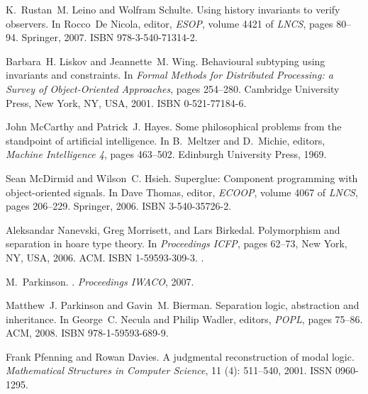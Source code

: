 \documentclass[natbib]{sigplanconf}
\begin{document}
\begin{thebibliography}{26}
K.~Rustan~M. Leino and Wolfram Schulte.
\newblock Using history invariants to verify observers.
\newblock In Rocco~De Nicola, editor, \emph{ESOP}, volume 4421 of \emph{LNCS},
  pages 80--94. Springer, 2007.
\newblock ISBN 978-3-540-71314-2.

Barbara~H. Liskov and Jeannette~M. Wing.
\newblock Behavioural subtyping using invariants and constraints.
\newblock In \emph{Formal Methods for Distributed Processing: a Survey of
  Object-Oriented Approaches}, pages 254--280. Cambridge University Press, New
  York, NY, USA, 2001.
\newblock ISBN 0-521-77184-6.

John McCarthy and Patrick~J. Hayes.
\newblock Some philosophical problems from the standpoint of artificial
  intelligence.
\newblock In B.~Meltzer and D.~Michie, editors, \emph{Machine Intelligence 4},
  pages 463--502. Edinburgh University Press, 1969.

Sean McDirmid and Wilson~C. Hsieh.
\newblock Superglue: Component programming with object-oriented signals.
\newblock In Dave Thomas, editor, \emph{ECOOP}, volume 4067 of \emph{LNCS},
  pages 206--229. Springer, 2006.
\newblock ISBN 3-540-35726-2.

Aleksandar Nanevski, Greg Morrisett, and Lars Birkedal.
\newblock Polymorphism and separation in hoare type theory.
\newblock In \emph{Proceedings ICFP}, pages 62--73, New York, NY, USA, 2006.
  ACM.
\newblock ISBN 1-59593-309-3.
\newblock {}.

M.~Parkinson.
.
\newblock \emph{Proceedings IWACO}, 2007.

Matthew~J. Parkinson and Gavin~M. Bierman.
\newblock Separation logic, abstraction and inheritance.
\newblock In George~C. Necula and Philip Wadler, editors, \emph{POPL}, pages
  75--86. ACM, 2008.
\newblock ISBN 978-1-59593-689-9.

Frank Pfenning and Rowan Davies.
\newblock A judgmental reconstruction of modal logic.
\newblock \emph{Mathematical Structures in Computer Science}, 11
  (4): 511--540, 2001.
\newblock ISSN 0960-1295.


\end{thebibliography}
\end{document}
